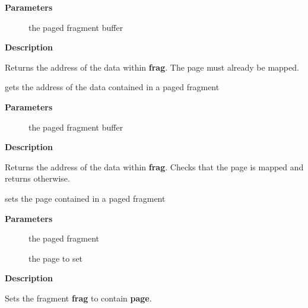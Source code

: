\documentclass[a4paper,8pt,english]{sphinxmanual}
\begin{document}
\textbf{Parameters}
\begin{description}
\item[{}] \leavevmode
the paged fragment buffer

\end{description}

\textbf{Description}

Returns the address of the data within \textbf{frag}. The page must already
be mapped.

\begin{fulllineitems}
\label{networking/kapi:c.skb_frag_address_safe}
gets the address of the data contained in a paged fragment

\end{fulllineitems}


\textbf{Parameters}
\begin{description}
\item[{}] \leavevmode
the paged fragment buffer

\end{description}

\textbf{Description}

Returns the address of the data within \textbf{frag}. Checks that the page
is mapped and returns  otherwise.

\begin{fulllineitems}
\label{networking/kapi:c.__skb_frag_set_page}
sets the page contained in a paged fragment

\end{fulllineitems}


\textbf{Parameters}
\begin{description}
\item[{}] \leavevmode
the paged fragment

\item[{}] \leavevmode
the page to set

\end{description}

\textbf{Description}

Sets the fragment \textbf{frag} to contain \textbf{page}.
\end{document}
